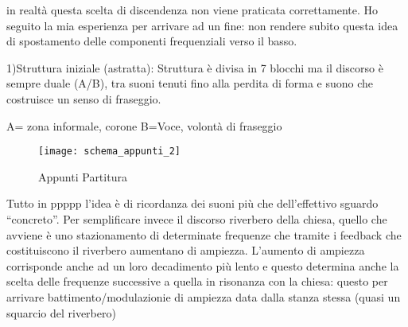 in realtà questa scelta di discendenza non viene praticata correttamente.
Ho seguito la mia esperienza per arrivare ad un fine: non rendere subito questa
idea di spostamento delle componenti frequenziali verso il basso.

1)Struttura iniziale (astratta):
Struttura è divisa in 7 blocchi ma il discorso è sempre duale (A/B), tra suoni
tenuti fino alla perdita di forma e suono che costruisce un senso di fraseggio.

A= zona informale, corone
B=Voce, volontà di fraseggio

\begin{figure}
\centering
{\texttt{[image: schema\_appunti\_2]}}
\caption[Appunti Partitura]{Appunti Partitura}
\label{fig:tetratetra}
\end{figure}

Tutto in ppppp l'idea  è di ricordanza dei suoni più che dell'effettivo sguardo “concreto”.
Per semplificare invece il discorso riverbero della chiesa, quello che avviene è
uno stazionamento di determinate frequenze che tramite i feedback che costituiscono
il riverbero aumentano di ampiezza. L'aumento di ampiezza corrisponde anche ad un loro
decadimento più lento e questo determina anche la scelta delle frequenze successive a
quella in risonanza con la chiesa: questo per arrivare  battimento/modulazionie di
ampiezza data dalla stanza stessa (quasi un squarcio del riverbero)

%
%
%
